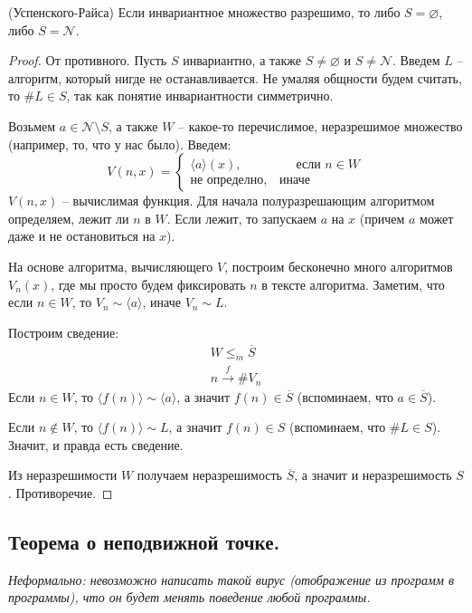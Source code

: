 \begin{theorem} (Успенского-Райса)
    Если инвариантное множество разрешимо, то либо $S = \varnothing$, либо $S = \mathcal{N}$.  
\end{theorem}
\begin{proof}
    От противного. Пусть $S$ инвариантно, а также $S \neq \varnothing$ и $S \neq \mathcal{N}$. Введем $L$ -- алгоритм, который нигде не останавливается. Не умаляя общности будем считать, то $\#L \in S$, так как понятие инвариантности симметрично.

    Возьмем $a \in \mathcal{N} \setminus S$, а также $W$ -- какое-то перечислимое, неразрешимое множество (например, то, что у нас было). Введем: \[ V(n, x) = \begin{cases}
        \langle a \rangle (x), \quad\quad\quad\quad\; \text{если } n \in W \\
        \text{не определно}, \quad \text{иначе}
    \end{cases} \]
    $V(n, x)$ -- вычислимая функция. Для начала полуразрешающим алгоритмом определяем, лежит ли $n$ в $W$. Если лежит, то запускаем $a$ на $x$ (причем $a$ может даже и не остановиться на $x$).

    На основе алгоритма, вычисляющего $V$, построим бесконечно много алгоритмов $V_n(x)$, где мы просто будем фиксировать $n$ в тексте алгоритма. Заметим, что если $n \in W$, то $V_n \sim \langle a \rangle$, иначе $V_n \sim L$.

    Построим сведение: \begin{gather*}
        W \leqslant_m \overline{S} \\
        n \xrightarrow{f} \#V_n
    \end{gather*}
    Если $n \in W$, то $\langle f(n) \rangle \sim \langle a \rangle$, а значит $f(n) \in \overline{S}$ (вспоминаем, что $a \in \overline{S}$).

    Если $n \notin W$, то $\langle f(n) \rangle \sim L$, а значит $f(n) \in S$ (вспоминаем, что $\#L \in S$). Значит, и правда есть сведение.

    Из неразрешимости $W$ получаем неразрешимость $\overline{S}$, а значит и неразрешимость $S$. Противоречие.
\end{proof}

\subsection{Теорема о неподвижной точке.}

\textit{Неформально: невозможно написать такой вирус (отображение из программ в программы), что он будет менять поведение любой программы.}

